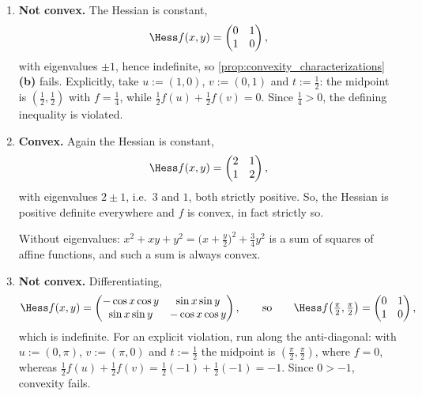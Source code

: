 \begin{exercisesolution}
\label{sol:convex_or_not}
\begin{enumerate}[label=\textbf{(\alph*)}]
  \item \textbf{Not convex.} The Hessian is constant,
    \[\Hess f(x,y) = \begin{pmatrix} 0 & 1 \\ 1 & 0\end{pmatrix},\]
    with eigenvalues $\pm1$, hence indefinite, so
    \cref{prop:convexity_characterizations}\textbf{(b)} fails. Explicitly, take
    $u := (1,0)$, $v := (0,1)$ and $t := \tfrac12$: the midpoint is $(\tfrac12,\tfrac12)$ with
    $f = \tfrac14$, while $\tfrac12 f(u) + \tfrac12 f(v) = 0$. Since
    $\tfrac14 > 0$, the defining inequality is violated.
  \item \textbf{Convex.} Again the Hessian is constant,
    \[\Hess f(x,y) = \begin{pmatrix} 2 & 1 \\ 1 & 2\end{pmatrix},\]
    with eigenvalues $2 \pm 1$, i.e.\ $3$ and $1$, both strictly positive. So, the Hessian is
    positive definite everywhere and $f$ is convex, in fact strictly so.

    Without eigenvalues: $x^2+xy+y^2 = \big(x+\tfrac{y}{2}\big)^2 + \tfrac34 y^2$ is a sum of
    squares of affine functions, and such a sum is always convex.
  \item \textbf{Not convex.} Differentiating,
    \[\Hess f(x,y) = \begin{pmatrix} -\cos x\cos y & \sin x\sin y \\
      \sin x\sin y & -\cos x\cos y\end{pmatrix},
      \qquad\text{so}\qquad
      \Hess f\big(\tfrac{\pi}{2},\tfrac{\pi}{2}\big)
      = \begin{pmatrix}0&1\\1&0\end{pmatrix},\]
    which is indefinite. For an explicit violation, run along the anti-diagonal: with
    $u := (0,\pi)$, $v := (\pi,0)$ and $t := \tfrac12$ the midpoint is
    $(\tfrac{\pi}{2},\tfrac{\pi}{2})$, where $f = 0$, whereas
    $\tfrac12 f(u) + \tfrac12 f(v) = \tfrac12(-1) + \tfrac12(-1) = -1$. Since $0 > -1$, convexity
    fails.


\end{enumerate}
\end{exercisesolution}
